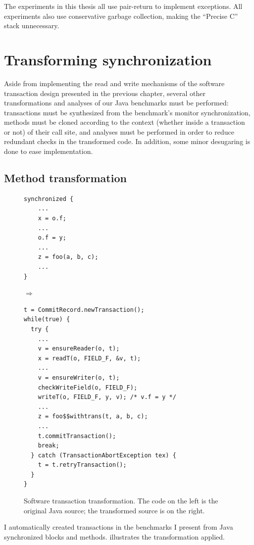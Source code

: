 The experiments in this thesis all use pair-return to implement
exceptions.  All experiments also use conservative garbage
collection, making the ``Precise C'' stack unnecessary.

\section{Transforming synchronization}\label{sec:synctrans}
Aside from implementing the read and write mechanisms of the software
transaction design presented in the previous chapter, several
other transformations and analyses of our Java benchmarks must be
performed: transactions must be synthesized from the benchmark's
monitor synchronization, methods must be cloned according to the
context (whether inside a transaction or not) of their call site,
and analyses must be performed in order to reduce redundant checks in the
transformed code.  In addition, some minor desugaring is done to ease
implementation.

\subsection{Method transformation}
\begin{figure}\sis\fontsize{9}{10}
\begin{minipage}{1.5in}
\begin{verbatim}
synchronized {
    ...
    x = o.f;
    ...
    o.f = y;
    ...
    z = foo(a, b, c);
    ...
}
\end{verbatim}
\end{minipage}
$\Rightarrow\quad$
\begin{minipage}{3in}
\begin{verbatim}
t = CommitRecord.newTransaction();
while(true) {
  try {
    ...
    v = ensureReader(o, t);
    x = readT(o, FIELD_F, &v, t);
    ...
    v = ensureWriter(o, t);
    checkWriteField(o, FIELD_F);
    writeT(o, FIELD_F, y, v); /* v.f = y */
    ...
    z = foo$$withtrans(t, a, b, c);
    ...
    t.commitTransaction();
    break;
  } catch (TransactionAbortException tex) {
    t = t.retryTransaction();
  }
}
\end{verbatim}
\end{minipage}
\caption[Software transaction transformation.]
{Software transaction transformation.  The code on the left is the
  original Java source; the transformed source is on the right.}
\label{fig:synctrans}\end{figure}

I automatically created transactions in the benchmarks I present from
Java synchronized blocks and methods.   illustrates
the transformation applied.

